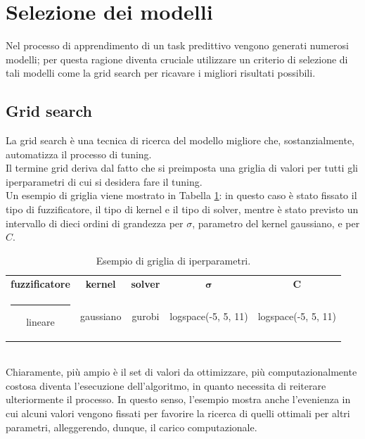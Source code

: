 \documentclass[12pt]{report}
\makeatletter
\theoremstyle{definition}
\newcommand{\thickhline}{%
    \noalign {\ifnum 0=`}\fi \hrule height 1pt
    \futurelet \reserved@a \@xhline
}
\makeatother
\begin{document}
\section{Selezione dei modelli}\label{modelselection}
Nel processo di apprendimento di un task predittivo vengono generati numerosi modelli; per questa ragione diventa cruciale utilizzare un criterio di selezione di tali modelli come la grid search per ricavare i migliori risultati possibili.

\subsection{Grid search}\label{gs}
La grid search è una tecnica di ricerca del modello migliore che, sostanzialmente, automatizza il processo di tuning.
\\
Il termine grid deriva dal fatto che si preimposta una griglia di valori per tutti gli iperparametri di cui si desidera fare il tuning.
\\
Un esempio di griglia viene mostrato in Tabella \ref{grid}: in questo caso è stato fissato il tipo di fuzzificatore, il tipo di kernel e il tipo di solver, mentre è stato previsto un intervallo di dieci ordini di grandezza per $\sigma$, parametro del kernel gaussiano, e per $C$.
\\
\begin{table}[!h]
\centering
 \begin{tabular}{|c|c|c|c|c|} 
 \hline
\textbf{fuzzificatore} & \textbf{kernel} & \textbf{solver} & $\bm{\sigma}$ & $\mathbf{C}$ 
\\ [0.5ex] 
 \thickhline
 lineare & gaussiano & gurobi & logspace(-5, 5, 11) & logspace(-5, 5, 11) \\ 
 \hline
\end{tabular}
\caption{Esempio di griglia di iperparametri.}
\label{grid}
\end{table}
\leavevmode\\
Chiaramente, più ampio è il set di valori da ottimizzare, più computazionalmente costosa diventa l'esecuzione dell'algoritmo, in quanto necessita di reiterare ulteriormente il processo. In questo senso, l'esempio mostra anche l'evenienza in cui alcuni valori vengono fissati per favorire la ricerca di quelli ottimali per altri parametri, alleggerendo, dunque, il carico computazionale.
\end{document}

